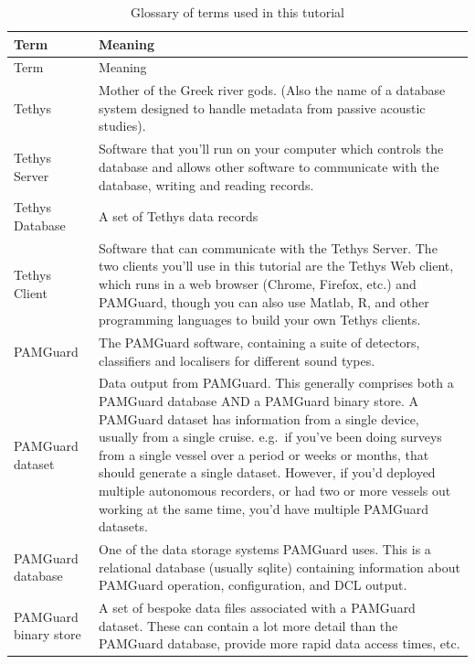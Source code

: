 \documentclass[
]{article}
\begin{document}
\begin{longtable}[]{@{}
  >{\raggedright\arraybackslash}p{}
  >{\raggedright\arraybackslash}p{}@{}}
\caption{Glossary of terms used in this
tutorial}\label{tbl-glossary}\tabularnewline
\toprule\noalign{}
\begin{minipage}[b]{\linewidth}\raggedright
Term
\end{minipage} & \begin{minipage}[b]{\linewidth}\raggedright
Meaning
\end{minipage} \\
\midrule\noalign{}
\endfirsthead
\toprule\noalign{}
\begin{minipage}[b]{\linewidth}\raggedright
Term
\end{minipage} & \begin{minipage}[b]{\linewidth}\raggedright
Meaning
\end{minipage} \\
\midrule\noalign{}
\endhead
\bottomrule\noalign{}
\endlastfoot
Tethys & Mother of the Greek river gods. (Also the name of a database
system designed to handle metadata from passive acoustic studies). \\
Tethys Server & Software that you'll run on your computer which controls
the database and allows other software to communicate with the database,
writing and reading records. \\
Tethys Database & A set of Tethys data records \\
Tethys Client & Software that can communicate with the Tethys Server.
The two clients you'll use in this tutorial are the Tethys Web client,
which runs in a web browser (Chrome, Firefox, etc.) and PAMGuard, though
you can also use Matlab, R, and other programming languages to build
your own Tethys clients. \\
PAMGuard & The PAMGuard software, containing a suite of detectors,
classifiers and localisers for different sound types. \\
PAMGuard dataset & Data output from PAMGuard. This generally comprises
both a PAMGuard database AND a PAMGuard binary store. A PAMGuard dataset
has information from a single device, usually from a single cruise.
e.g.~if you've been doing surveys from a single vessel over a period or
weeks or months, that should generate a single dataset. However, if
you'd deployed multiple autonomous recorders, or had two or more vessels
out working at the same time, you'd have multiple PAMGuard datasets. \\
PAMGuard database & One of the data storage systems PAMGuard uses. This
is a relational database (usually sqlite) containing information about
PAMGuard operation, configuration, and DCL output. \\
PAMGuard binary store & A set of bespoke data files associated with a
PAMGuard dataset. These can contain a lot more detail than the PAMGuard
database, provide more rapid data access times, etc. \\
\end{longtable}
\end{document}

